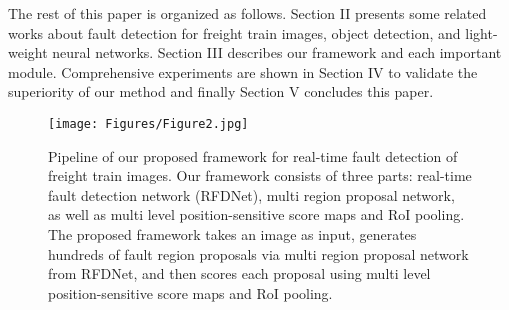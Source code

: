The rest of this paper is organized as follows. Section II presents some related works about fault detection for freight train images, object detection, and light-weight neural networks. Section III describes our framework and each important module. Comprehensive experiments are shown in Section IV to validate the superiority of our method and finally Section V concludes this paper.

\begin{figure*}[!t]
 \centering
 \texttt{[image: Figures/Figure2.jpg]}
 \caption{Pipeline of our proposed framework for real-time fault detection of freight train images. Our framework consists of three parts: real-time fault detection network (RFDNet), multi region proposal network, as well as multi level position-sensitive score maps and RoI pooling. The proposed framework takes an image as input, generates hundreds of fault region proposals via multi region proposal network from RFDNet, and then scores each proposal using multi level position-sensitive score maps and RoI pooling.}
 \label{fig:pipeline}
\end{figure*} 